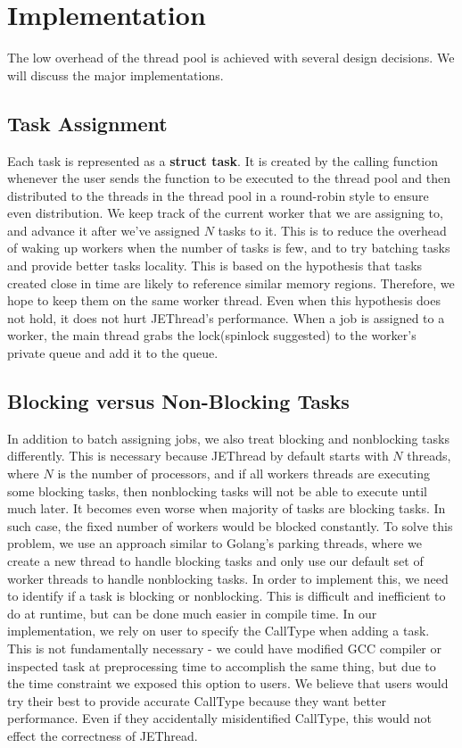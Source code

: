 \documentclass[journal, a4paper]{IEEEtran}
\begin{document}
\section{Implementation}
The low overhead of the thread pool is achieved with several design decisions. We will discuss the major implementations. 
\subsection{Task Assignment}
Each task is represented as a \textbf{struct task}. It is created by the calling function whenever the user sends the function to be executed to the thread pool and then distributed to the threads in the thread pool in a round-robin style to ensure even distribution. We keep track of the current worker that we are assigning to, and advance it after we've assigned $N$ tasks to it. This is to reduce the overhead of waking up workers when the number of tasks is few, and to try batching tasks and provide better tasks locality. This is based on the hypothesis that tasks created close in time are likely to reference similar memory regions. Therefore, we hope to keep them on the same worker thread. Even when this hypothesis does not hold, it does not hurt JEThread's performance. When a job is assigned to a worker, the main thread grabs the lock(spinlock suggested) to the worker's private queue and add it to the queue.

\subsection{Blocking versus Non-Blocking Tasks}
In addition to batch assigning jobs, we also treat blocking and nonblocking tasks differently. This is necessary because JEThread by default starts with $N$ threads, where $N$ is the number of processors, and if all workers threads are executing some blocking tasks, then nonblocking tasks will not be able to execute until much later. It becomes even worse when majority of tasks are blocking tasks. In such case, the fixed number of workers would be blocked constantly. To solve this problem, we use an approach similar to Golang's parking threads, where we create a new thread to handle blocking tasks and only use our default set of worker threads to handle nonblocking tasks. In order to implement this, we need to identify if a task is blocking or nonblocking. This is difficult and inefficient to do at runtime, but can be done much easier in compile time. In our implementation, we rely on user to specify the CallType when adding a task. This is not fundamentally necessary - we could have modified GCC compiler or inspected task at preprocessing time to accomplish the same thing, but due to the time constraint we exposed this option to users. We believe that users would try their best to provide accurate CallType because they want better performance. Even if they accidentally misidentified CallType, this would not effect the correctness of JEThread.
\end{document}
